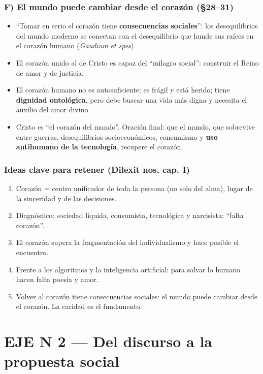 \documentclass[10pt,a4paper]{article}
\begin{document}
\subsubsection{F) El mundo puede cambiar desde el corazón (\S{}28--31)}
\begin{itemize}
\item ``Tomar en serio el corazón tiene \textbf{consecuencias sociales}'': los desequilibrios del mundo moderno se conectan con el desequilibrio que hunde sus raíces en el corazón humano (\textit{Gaudium et spes}).
\item El corazón unido al de Cristo es capaz del ``milagro social'': construir el Reino de amor y de justicia.
\item El corazón humano no es autosuficiente: es frágil y está herido; tiene \textbf{dignidad ontológica}, pero debe buscar una vida más digna y necesita el auxilio del amor divino.
\item Cristo es ``el corazón del mundo''. Oración final: que el mundo, que sobrevive entre guerras, desequilibrios socioeconómicos, consumismo y \textbf{uso antihumano de la tecnología}, recupere el corazón.
\end{itemize}

\subsubsection{Ideas clave para retener (Dilexit nos, cap. I)}
\begin{enumerate}
\item Corazón = centro unificador de toda la persona (no solo del alma), lugar de la sinceridad y de las decisiones.
\item Diagnóstico: sociedad líquida, consumista, tecnológica y narcisista; ``falta corazón''.
\item El corazón supera la fragmentación del individualismo y hace posible el encuentro.
\item Frente a los algoritmos y la inteligencia artificial: para salvar lo humano hacen falta poesía y amor.
\item Volver al corazón tiene consecuencias sociales: el mundo puede cambiar desde el corazón. La caridad es el fundamento.
\end{enumerate}



\clearpage\section{EJE N\textordmasculine{} 2 --- Del discurso a la propuesta social}
\end{document}
